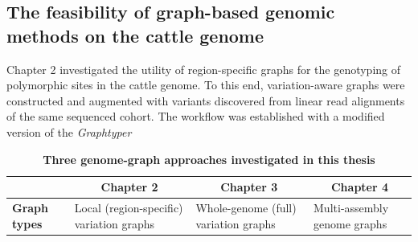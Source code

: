 \documentclass[../main.tex]{subfiles}
\begin{document}
\subsection*{The feasibility of graph-based genomic methods on the cattle genome}


Chapter 2 investigated the utility of region-specific graphs for the genotyping of polymorphic sites in the cattle genome. To this end, variation-aware graphs were constructed and augmented with variants discovered from linear read alignments of the same sequenced cohort. The workflow was established with a modified version of the \emph{Graphtyper} 


\begin{landscape}
   \thispagestyle{noheadi}
   \begin{table}
      \centering
      \footnotesize
      \caption[Three genome-graph approaches investigated in this thesis]{\textbf{Three genome-graph approaches investigated in this thesis}}
      \vspace{1em}
      \begin{tabular}{|l|l|l|l|} 
      \cline{2-4}
      \multicolumn{1}{l|}{}                                                                               & \multicolumn{1}{c|}{\textbf{Chapter 2}}                                                                                                                                                                                                                                                                       & \multicolumn{1}{c|}{\textbf{Chapter 3}}                                                                                                                                                                                                                  & \multicolumn{1}{c|}{\textbf{Chapter 4}}                                                                                                                                                                                                                      \\ 
      \hline
      \textbf{Graph types}                                                                                & Local (region-specific) variation graphs                                                                                                                                                                                                                                                                      & Whole-genome (full) variation graphs                                                                                                                                                                                                                     & Multi-assembly genome graphs                                                                                                                                                                                                                                 \\ 

\end{tabular}
\end{table}
\end{landscape}
\end{document}
